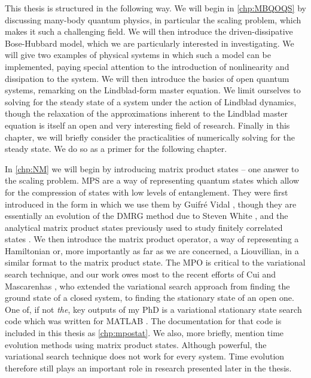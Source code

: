 This thesis is structured in the following way. We will begin in \cref{chp:MBQOQS} by discussing many-body quantum physics, in particular the scaling problem, which makes it such a challenging field. We will then introduce the driven-dissipative Bose-Hubbard model, which we are particularly interested in investigating. We will give two examples of physical systems in which such a model can be implemented, paying special attention to the introduction of nonlinearity and dissipation to the system. We will then introduce the basics of open quantum systems, remarking on the Lindblad-form master equation. We limit ourselves to solving for the steady state of a system under the action of Lindblad dynamics, though the relaxation of the approximations inherent to the Lindblad master equation is itself an open and very interesting field of research. Finally in this chapter, we will briefly consider the practicalities of numerically solving for the steady state. We do so as a primer for the following chapter.

In \cref{chp:NM} we will begin by introducing matrix product states -- one answer to the scaling problem. MPS are a way of representing quantum states which allow for the compression of states with low levels of entanglement. They were first introduced in the form in which we use them by Guifr\'{e} Vidal \cite{Vidal2003,Vidal2004}, though they are essentially an evolution of the DMRG method due to Steven White \cite{White1992,White1993}, and the analytical matrix product states previously used to study finitely correlated states \cite{Affleck1987}. We then introduce the matrix product operator, a way of representing a Hamiltonian or, more importantly as far as we are concerned, a Liouvillian, in a similar format to the matrix product state. The MPO is critical to the variational search technique, and our work owes most to the recent efforts of Cui \cite{Cui2015} and Mascarenhas \cite{Mascarenhas2015}, who extended the variational search approach from finding the ground state of a closed system, to finding the stationary state of an open one. One of, if not \emph{the}, key outputs of my PhD is a variational stationary state search code \cite{otb:gitVSSS} which was written for MATLAB \cite{MATLAB}. The documentation for that code is included in this thesis as \cref{chp:mpostat}. We also, more briefly, mention time evolution methods using matrix product states. Although powerful, the variational search technique does not work for every system. Time evolution therefore still plays an important role in research presented later in the thesis.

